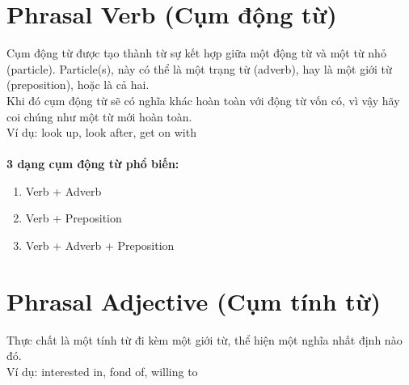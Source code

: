 \section{Phrasal Verb (Cụm động từ)}
Cụm động từ được tạo thành từ sự kết hợp giữa một động từ và một từ nhỏ (particle). Particle(s), này có thể là một trạng từ (adverb), hay là một giới từ (preposition), hoặc là cả hai. 
\\Khi đó cụm động từ sẽ có nghĩa khác hoàn toàn với động từ vốn có, vì vậy hãy coi chúng như một từ mới hoàn toàn.
\\Ví dụ: look up, look after, get on with\\\\
\textbf{3 dạng cụm động từ phổ biến:}
\begin{enumerate}
    \item Verb + Adverb
    \item Verb + Preposition
    \item Verb + Adverb + Preposition
\end{enumerate}

\section{Phrasal Adjective (Cụm tính từ)}
Thực chất là một tính từ đi kèm một giới từ, thể hiện một nghĩa nhất định nào đó.\\
Ví dụ: interested in, fond of, willing to